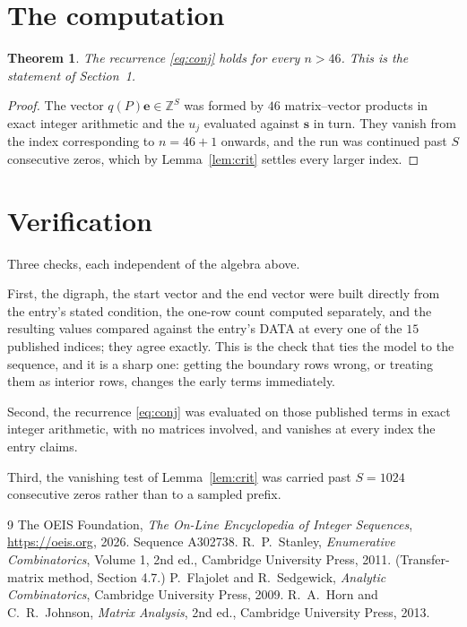 \documentclass[11pt,a4paper]{article}
\theoremstyle{plain}
\newtheorem{theorem}{Theorem}
\theoremstyle{definition}
\begin{document}
\section{The computation}

\begin{theorem}
The recurrence \eqref{eq:conj} holds for every $n>46$. This is the statement of
Section~1.
\end{theorem}

\begin{proof}
The vector $q(P)\mathbf{e}\in\mathbb{Z}^{S}$ was formed by $46$ matrix--vector
products in exact integer arithmetic and the $u_j$ evaluated against $\mathbf{s}$ in turn.
They vanish from the index corresponding to $n=46+1$ onwards, and the run was continued
past $S$ consecutive zeros, which by Lemma~\ref{lem:crit} settles every larger index.
\end{proof}

\section{Verification}

Three checks, each independent of the algebra above.

First, the digraph, the start vector and the end vector were built directly from the
entry's stated condition, the one-row count computed separately, and the resulting values
compared against the entry's DATA at every one of the $15$ published indices; they
agree exactly. This is the check that ties the model to the sequence, and it is a sharp one:
getting the boundary rows wrong, or treating them as interior rows, changes the early terms
immediately.

Second, the recurrence \eqref{eq:conj} was evaluated on those published terms in exact
integer arithmetic, with no matrices involved, and vanishes at every index the entry claims.

Third, the vanishing test of Lemma~\ref{lem:crit} was carried past $S=1024$ consecutive
zeros rather than to a sampled prefix.

\begin{thebibliography}{9}
 The OEIS Foundation, \emph{The On-Line Encyclopedia of Integer
Sequences}, \url{https://oeis.org}, 2026. Sequence A302738.
 R.~P.~Stanley, \emph{Enumerative Combinatorics}, Volume 1, 2nd ed.,
Cambridge University Press, 2011. (Transfer-matrix method, Section 4.7.)
 P.~Flajolet and R.~Sedgewick, \emph{Analytic Combinatorics}, Cambridge
University Press, 2009.
 R.~A.~Horn and C.~R.~Johnson, \emph{Matrix Analysis}, 2nd ed., Cambridge
University Press, 2013.
\end{thebibliography}
\end{document}
